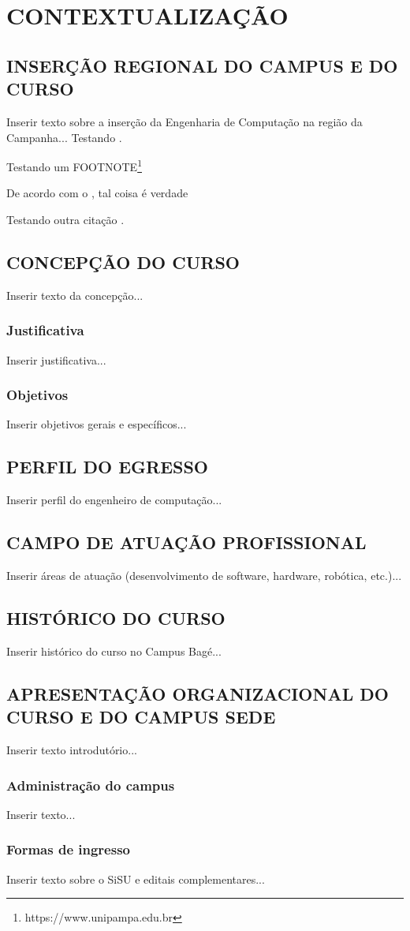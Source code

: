 
\chapter{CONTEXTUALIZAÇÃO}

\section{INSERÇÃO REGIONAL DO CAMPUS E DO CURSO}
Inserir texto sobre a inserção da Engenharia de Computação na região da Campanha... Testando \cite{conaes:2010}. 

Testando um FOOTNOTE\footnote[1]{https://www.unipampa.edu.br}

De acordo com o , tal coisa é verdade

Testando outra citação \cite{mec:2016:seb}.

\section{CONCEPÇÃO DO CURSO}
Inserir texto da concepção...

\subsection{Justificativa}
Inserir justificativa...

\subsection{Objetivos}
Inserir objetivos gerais e específicos...

\section{PERFIL DO EGRESSO}
Inserir perfil do engenheiro de computação...

\section{CAMPO DE ATUAÇÃO PROFISSIONAL}
Inserir áreas de atuação (desenvolvimento de software, hardware, robótica, etc.)...

\section{HISTÓRICO DO CURSO}
Inserir histórico do curso no Campus Bagé...

\section{APRESENTAÇÃO ORGANIZACIONAL DO CURSO E DO CAMPUS SEDE}
Inserir texto introdutório...

\subsection{Administração do campus}
Inserir texto...

\subsection{Formas de ingresso}
Inserir texto sobre o SiSU e editais complementares...